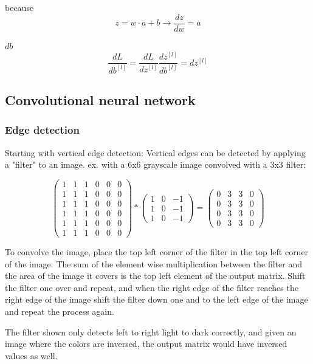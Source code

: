 \documentclass[12pt]{article}
\begin{document}
because
\[ z = w \cdot a + b \rightarrow \frac{dz}{dw} = a \]

$db$
\[ \frac{dL}{db^{[l]}} = \frac{dL}{dz^{[l]}} \frac{dz^{[l]}}{db^{[l]}} = dz^{[l]} \]

\subsection{Convolutional neural network}

\subsubsection{Edge detection}

Starting with vertical edge detection: Vertical edges can be detected by applying
a "filter" to an image. ex. with a 6x6 grayscale image convolved with a 3x3 filter:

\[
    \begin{pmatrix}
        1 & 1 & 1 & 0 & 0 & 0\\
        1 & 1 & 1 & 0 & 0 & 0\\
        1 & 1 & 1 & 0 & 0 & 0\\
        1 & 1 & 1 & 0 & 0 & 0\\
        1 & 1 & 1 & 0 & 0 & 0\\
        1 & 1 & 1 & 0 & 0 & 0
    \end{pmatrix}
    *
    \begin{pmatrix}
        1 & 0 & -1\\
        1 & 0 & -1\\
        1 & 0 & -1
    \end{pmatrix}
    =
    \begin{pmatrix}
        0 & 3 & 3 & 0\\
        0 & 3 & 3 & 0\\
        0 & 3 & 3 & 0\\
        0 & 3 & 3 & 0
    \end{pmatrix}
\]

To convolve the image, place the top left corner of the filter in the top left corner of
the image. The sum of the element wise multiplication between the filter and the area of
the image it covers is the top left element of the output matrix. Shift the filter one over
and repeat, and when the right edge of the filter reaches the right edge of the image shift
the filter down one and to the left edge of the image and repeat the process again.

The filter shown only detects left to right light to dark correctly, and given an image where
the colors are inversed, the output matrix would have inversed values as well.
\end{document}
